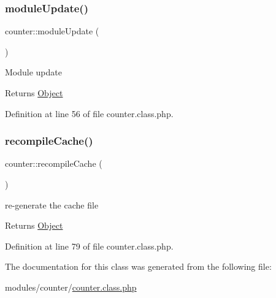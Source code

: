 \subsubsection{\texorpdfstring{module\+Update()}{moduleUpdate()}}
{\footnotesize\ttfamily counter\+::module\+Update (\begin{DoxyParamCaption}{ }\end{DoxyParamCaption})}

Module update

\begin{DoxyReturn}{Returns}
\hyperlink{classObject}{Object} 
\end{DoxyReturn}


Definition at line 56 of file counter.\+class.\+php.

\mbox{\label{classcounter_a44bf39e02c7cb7c4a3c3000f9b8fba27}} 
\subsubsection{\texorpdfstring{recompile\+Cache()}{recompileCache()}}
{\footnotesize\ttfamily counter\+::recompile\+Cache (\begin{DoxyParamCaption}{ }\end{DoxyParamCaption})}

re-\/generate the cache file

\begin{DoxyReturn}{Returns}
\hyperlink{classObject}{Object} 
\end{DoxyReturn}


Definition at line 79 of file counter.\+class.\+php.



The documentation for this class was generated from the following file\+:\begin{DoxyCompactItemize}
\item 
modules/counter/\hyperlink{counter_8class_8php}{counter.\+class.\+php}\end{DoxyCompactItemize}
